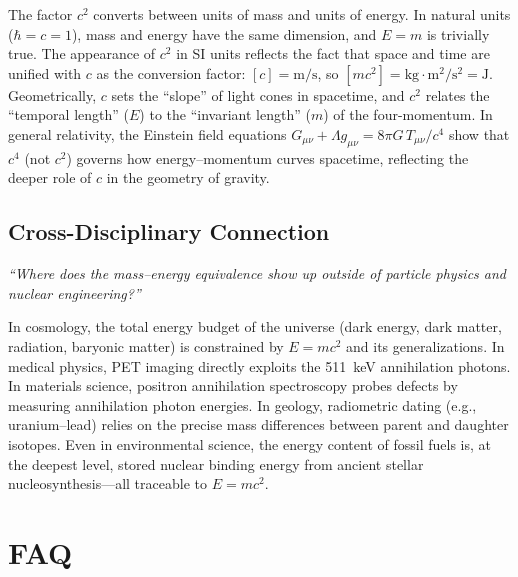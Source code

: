 The factor $c^{2}$ converts between units of mass and units of energy. In natural units ($\hbar = c = 1$), mass and energy have the same dimension, and $E = m$ is trivially true. The appearance of $c^{2}$ in SI units reflects the fact that space and time are unified with $c$ as the conversion factor: $[c] = \text{m/s}$, so $[mc^{2}] = \text{kg} \cdot \text{m}^{2}/\text{s}^{2} = \text{J}$. Geometrically, $c$ sets the ``slope'' of light cones in spacetime, and $c^{2}$ relates the ``temporal length'' ($E$) to the ``invariant length'' ($m$) of the four-momentum. In general relativity, the Einstein field equations $G_{\mu\nu} + \Lambda g_{\mu\nu} = 8\pi G\,T_{\mu\nu}/c^{4}$ show that $c^{4}$ (not $c^{2}$) governs how energy--momentum curves spacetime, reflecting the deeper role of $c$ in the geometry of gravity.

\subsection*{Cross-Disciplinary Connection}
\textit{``Where does the mass--energy equivalence show up outside of particle physics and nuclear engineering?''}

In cosmology, the total energy budget of the universe (dark energy, dark matter, radiation, baryonic matter) is constrained by $E = mc^{2}$ and its generalizations. In medical physics, PET imaging directly exploits the 511~keV annihilation photons. In materials science, positron annihilation spectroscopy probes defects by measuring annihilation photon energies. In geology, radiometric dating (e.g., uranium--lead) relies on the precise mass differences between parent and daughter isotopes. Even in environmental science, the energy content of fossil fuels is, at the deepest level, stored nuclear binding energy from ancient stellar nucleosynthesis---all traceable to $E = mc^{2}$.

\section*{FAQ}

